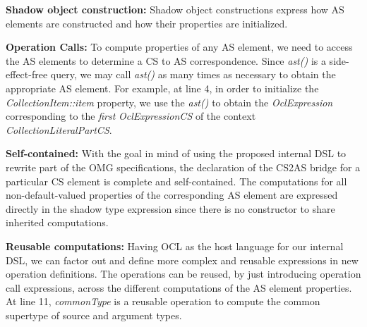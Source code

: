 \documentclass{llncs}
\begin{document}
\textbf{Shadow object construction:} Shadow object constructions express how AS elements are constructed and how their properties are initialized. %

\textbf{Operation Calls:} To compute properties of any AS element, we  need to access the AS elements to determine a CS to AS correspondence.
Since \emph{ast()} is a side-effect-free query, we may call  \emph{ast()} as many times as necessary to obtain the appropriate AS element.
For example, at line 4, in order to initialize the \emph{CollectionItem::item} property, we use the \emph{ast()} to obtain the \emph{OclExpression} corresponding to the \emph{first} \emph{OclExpressionCS} of the context \emph{CollectionLiteralPartCS}.

\textbf{Self-contained:} With the goal in mind of using the proposed internal DSL to rewrite part of the OMG specifications, the declaration of the CS2AS bridge for a particular CS element is complete and self-contained. The computations for all non-default-valued properties of the corresponding AS element are expressed directly in the shadow type expression since there is no constructor to share inherited computations.

\textbf{Reusable computations:} Having OCL as the  host language for our internal DSL, we can factor out and define more complex and reusable expressions in new operation definitions. The operations can be reused, by just introducing operation call expressions, across the different computations of the AS element properties. At line 11, \emph{commonType} is a reusable operation
 to compute the common supertype of source and argument types.

\end{document}
